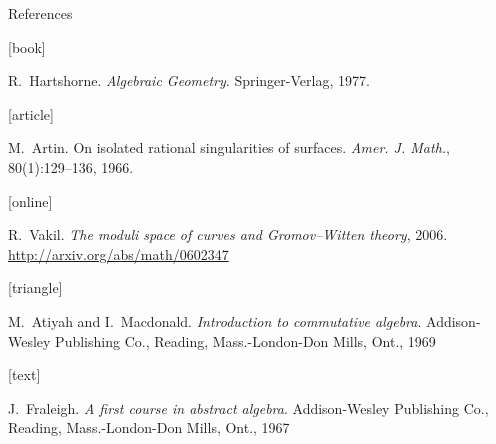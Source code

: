 \documentclass[UKenglish, aspectratio = 169]{beamer}
\begin{document}
\begin{frame}[allowframebreaks]{References}

    \begin{thebibliography}{}

        [book]

        R.~Hartshorne.
        \newblock \emph{Algebraic Geometry}.
        \newblock Springer-Verlag, 1977.

        [article]

        M.~Artin.
        \newblock On isolated rational singularities of surfaces.
        \newblock \emph{Amer. J. Math.}, 80(1):129--136, 1966.

        [online]

        R.~Vakil.
        \newblock \emph{The moduli space of curves and Gromov--Witten theory}, 2006.
        \newblock \url{http://arxiv.org/abs/math/0602347}

        [triangle]

        M.~Atiyah and I.~Macdonald.
        \newblock \emph{Introduction to commutative algebra}.
        \newblock Addison-Wesley Publishing Co., Reading, Mass.-London-Don
        Mills, Ont., 1969

        [text]

        J.~Fraleigh.
        \newblock \emph{A first course in abstract algebra}.
        \newblock Addison-Wesley Publishing Co., Reading, Mass.-London-Don Mills, Ont., 1967

    \end{thebibliography}
\end{frame}
\end{document}
